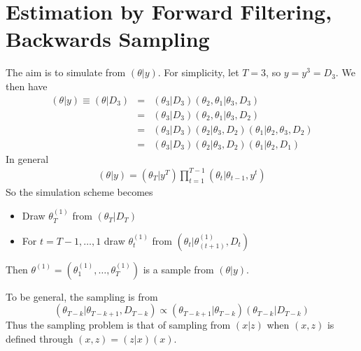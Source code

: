 \section{Estimation by Forward Filtering, Backwards
  Sampling}

The aim is to simulate from $(\theta|y)$. For simplicity,
let $T=3$, so $y=y^3=D_3$. We then have
\begin{eqnarray*}
  (\theta|y)\equiv(\theta|D_3) &=&
  (\theta_3|D_3)(\theta_2,\theta_1|\theta_3,D_3) \\
  &=&
  (\theta_3|D_3)(\theta_2,\theta_1|\theta_3,D_2) \\
  &=&
  (\theta_3|D_3)(\theta_2|\theta_3,D_2)(\theta_1|\theta_2,\theta_3,D_2) \\
  &=&
  (\theta_3|D_3)(\theta_2|\theta_3,D_2)(\theta_1|\theta_2,D_1)
\end{eqnarray*}
In general
\begin{eqnarray*}
  (\theta|y)=(\theta_T|y^T)\prod_{t=1}^{T-1}(\theta_t|\theta_{t-1},y^t)
\end{eqnarray*}
So the simulation scheme becomes
\begin{itemize}
\item Draw $\theta_T^{(1)}$ from $(\theta_T|D_T)$
\item For $t=T-1, \dots, 1$ draw $\theta_t^{(1)}$ from
  $(\theta_t|\theta_{(t+1)}^{(1)}, D_t)$
\end{itemize}
Then $\theta^{(1)}=(\theta^{(1)}_1, \dots, \theta^{(1)}_T)$
is a sample from $(\theta|y)$.

To be general, the sampling is from 
$$
(\theta_{T-k}|\theta_{T-k+1},D_{T-k})
\propto
(\theta_{T-k+1}|\theta_{T-k})(\theta_{T-k}|D_{T-k})
$$
Thus the sampling problem is that of sampling from $(x|z)$
when $(x,z)$ is defined through $(x,z)=(z|x)(x)$.
